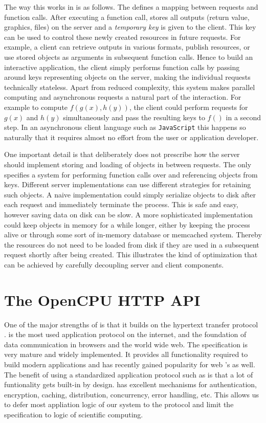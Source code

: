The way this works in \OpenCPU is as follows. The \API defines a mapping between \HTTP requests and \R function calls. After executing a function call, \OpenCPU stores all outputs (return value, graphics, files) on the server and a \emph{temporary key} is given to the client. This key can be used to control these newly created resources in future requests. For example, a client can retrieve outputs in various formats, publish resources, or use stored \R objects as arguments in subsequent function calls. Hence to build an interactive application, the client simply performs function calls by passing around keys representing objects on the server, making the individual requests technically stateless. Apart from reduced complexity, this system makes parallel computing and asynchronous requests a natural part of the interaction. For example to compute $f(g(x), h(y))$, the client could perform \RPC requests for $g(x)$ and $h(y)$ simultaneously and pass the resulting keys to $f()$ in a second step. In an asynchronous client language such as \texttt{JavaScript} this happens so naturally that it requires almost no effort from the user or application developer.

One important detail is that \OpenCPU deliberately does not prescribe how the server should implement storing and loading of objects in between requests. The \API only specifies a system for performing \R function calls over \HTTP and referencing objects from keys. Different server implementations can use different strategies for retaining such objects. A naive implementation could simply serialize objects to disk after each request and immediately terminate the process. This is safe and easy, however saving data on disk can be slow. A more sophisticated implementation could keep objects in memory for a while longer, either by keeping the \R process alive or through some sort of in-memory database or memcached system. 
Thereby the resources do not need to be loaded from disk if they are used in a subsequent request shortly after being created. This illustrates the kind of optimization that can be achieved by carefully decoupling server and client components.

 
\section{The OpenCPU HTTP API}

One of the major strengths of \OpenCPU is that it builds on the hypertext transfer protocol \citep{rfc2616}. \HTTP is the most used application protocol on the internet, and the foundation of data communication in browsers and the world wide web. The \HTTP specification is very mature and widely implemented. It provides all functionality required to build modern applications and has recently gained popularity for web \API's as well. The benefit of using a standardized application protocol such as \HTTP is that a lot of funtionality gets built-in by design. \HTTP has excellent mechanisms for authentication, encryption, caching, distribution, concurrency, error handling, etc. This allows us to defer most appliation logic of our system to the protocol and limit the \API specification to logic of scientific computing. 

